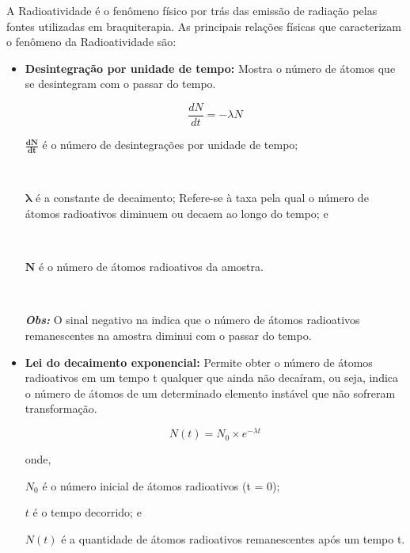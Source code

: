 \documentclass[11pt,a4paper]{article}
\newcounter{exemplo}
\begin{document}
		A Radioatividade é o fenômeno físico por trás das emissão de radiação pelas fontes utilizadas em braquiterapia. As principais relações físicas que caracterizam o fenômeno da Radioatividade são:

		\begin{itemize}
			\item \textbf{Desintegração por unidade de tempo:} Mostra o número de átomos que se desintegram com o passar do tempo. 

				\begin{equation}
					\frac{dN}{dt} = -\lambda N
					\label{eq:DesintegraçãoPorUnidadeDeTempo}
				\end{equation}
		
				\begin{exemplo}[onde:]
					\textcolor{CarnationPink}{$\mathbf{\frac{dN}{dt}}$} é o número de desintegrações por unidade de tempo;

					\

					\textcolor{CarnationPink}{$\mathbf{\lambda}$} é a constante de decaimento; Refere-se à taxa pela qual o número de átomos radioativos diminuem ou decaem ao longo do tempo; e

					\


					\textcolor{CarnationPink}{$\mathbf{N}$} é o número de átomos radioativos da amostra.

					\

					\textit{\textbf{\textcolor{CarnationPink}{Obs:}}} O sinal negativo na   indica que o número de átomos radioativos remanescentes na amostra diminui com o passar do tempo. 
				\end{exemplo}
				

			\item \textbf{Lei do decaimento exponencial: } Permite obter o número de átomos radioativos em  um tempo t qualquer que ainda não decaíram, ou seja, indica o número de átomos de um determinado elemento instável que não sofreram transformação.

				\begin{equation}
					N(t) = N_0 \times e^{-\lambda t}
					\label{eq:decaimentoExponencial}
				\end{equation}
				
				onde,

				$N_0$ é o número inicial de átomos radioativos (t = 0);
				
				$t$ é o tempo decorrido; e

				$N(t)$ é a quantidade de átomos radioativos remanescentes após um tempo t.


\end{itemize}
\end{document}

